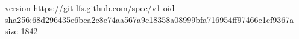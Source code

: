 version https://git-lfs.github.com/spec/v1
oid sha256:68d296435e6bca2c8e74aa567a9c18358a08999bfa716954ff97466e1cf9367a
size 1842
